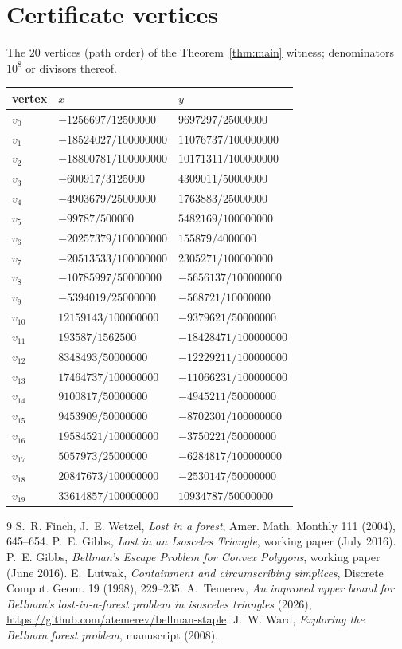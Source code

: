 \documentclass[11pt]{amsart}
\theoremstyle{remark}
\begin{document}
\section{Certificate vertices}\label{tab:verts}
The $20$ vertices (path order) of the Theorem~\ref{thm:main} witness;
denominators $10^8$ or divisors thereof.
\begin{longtable}{lll}
\hline
vertex & $x$ & $y$\\
\hline
$v_{0}$ & $-1256697/12500000$ & $9697297/25000000$ \\
$v_{1}$ & $-18524027/100000000$ & $11076737/100000000$ \\
$v_{2}$ & $-18800781/100000000$ & $10171311/100000000$ \\
$v_{3}$ & $-600917/3125000$ & $4309011/50000000$ \\
$v_{4}$ & $-4903679/25000000$ & $1763883/25000000$ \\
$v_{5}$ & $-99787/500000$ & $5482169/100000000$ \\
$v_{6}$ & $-20257379/100000000$ & $155879/4000000$ \\
$v_{7}$ & $-20513533/100000000$ & $2305271/100000000$ \\
$v_{8}$ & $-10785997/50000000$ & $-5656137/100000000$ \\
$v_{9}$ & $-5394019/25000000$ & $-568721/10000000$ \\
$v_{10}$ & $12159143/100000000$ & $-9379621/50000000$ \\
$v_{11}$ & $193587/1562500$ & $-18428471/100000000$ \\
$v_{12}$ & $8348493/50000000$ & $-12229211/100000000$ \\
$v_{13}$ & $17464737/100000000$ & $-11066231/100000000$ \\
$v_{14}$ & $9100817/50000000$ & $-4945211/50000000$ \\
$v_{15}$ & $9453909/50000000$ & $-8702301/100000000$ \\
$v_{16}$ & $19584521/100000000$ & $-3750221/50000000$ \\
$v_{17}$ & $5057973/25000000$ & $-6284817/100000000$ \\
$v_{18}$ & $20847673/100000000$ & $-2530147/50000000$ \\
$v_{19}$ & $33614857/100000000$ & $10934787/50000000$ \\
\hline
\end{longtable}

\begin{thebibliography}{9}
 S.~R. Finch, J.~E. Wetzel, \emph{Lost in a forest}, Amer.
Math. Monthly 111 (2004), 645--654.
 P.~E. Gibbs, \emph{Lost in an Isosceles Triangle},
working paper (July 2016).
 P.~E. Gibbs, \emph{Bellman's Escape Problem for Convex
Polygons}, working paper (June 2016).
 E.~Lutwak, \emph{Containment and circumscribing simplices},
Discrete Comput. Geom. 19 (1998), 229--235.
 A.~Temerev, \emph{An improved upper bound for Bellman's
lost-in-a-forest problem in isosceles triangles} (2026),
\url{https://github.com/atemerev/bellman-staple}.
 J.~W. Ward, \emph{Exploring the Bellman forest problem},
manuscript (2008).
\end{thebibliography}
\end{document}

